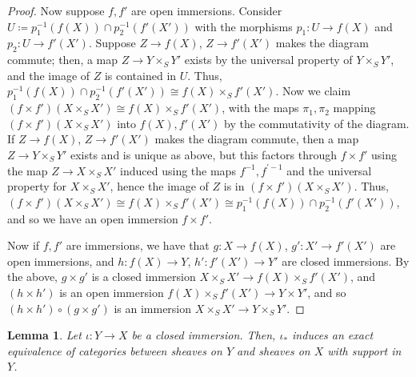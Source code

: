 \documentclass[12pt,letterpaper]{article}
\newtheorem{lemma}{Lemma}[section]
\theoremstyle{definition}
\theoremstyle{remark}
\numberwithin{equation}{section}
\numberwithin{figure}{problem}
\begin{document}
\begin{proof}
  \par Now suppose $f,f'$ are open immersions. Consider $U \coloneqq p_1^{-1}(f(X)) \cap p_2^{-1}(f'(X'))$ with the morphisms $p_1\colon U \to f(X)$ and $p_2\colon U \to f'(X')$. Suppose $Z \to f(X)$, $Z \to f'(X')$ makes the diagram commute; then, a map $Z \to Y \times_S Y'$ exists by the universal property of $Y \times_S Y'$, and the image of $Z$ is contained in $U$. Thus, $p_1^{-1}(f(X)) \cap p_2^{-1}(f'(X')) \cong f(X) \times_S f'(X')$. Now we claim $(f \times f')(X \times_S X') \cong f(X) \times_S f'(X')$, with the maps $\pi_1,\pi_2$ mapping $(f \times f')(X \times_S X')$ into $f(X),f'(X')$ by the commutativity of the diagram. If $Z \to f(X)$, $Z \to f'(X')$ makes the diagram commute, then a map $Z \to Y \times_S Y'$ exists and is unique as above, but this factors through $f \times f'$ using the map $Z \to X \times_S X'$ induced using the maps $f^{-1},f^{\prime-1}$ and the universal property for $X \times_S X'$, hence the image of $Z$ is in $(f \times f')(X \times_S X')$. Thus, $(f \times f')(X \times_S X') \cong f(X) \times_S f'(X') \cong p_1^{-1}(f(X)) \cap p_2^{-1}(f'(X'))$, and so we have an open immersion $f \times f'$.
  \par Now if $f,f'$ are immersions, we have that $g \colon X \to f(X)$, $g'\colon X' \to f'(X')$ are open immersions, and $h\colon f(X) \to Y$, $h'\colon f'(X') \to Y'$ are closed immersions. By the above, $g \times g'$ is a closed immersion $X \times_S X' \to f(X) \times_S f'(X')$, and $(h \times h')$ is an open immersion $f(X) \times_S f'(X') \to Y \times Y'$, and so $(h \times h') \circ (g \times g')$ is an immersion $X \times_S X' \to Y \times_S Y'$.
\end{proof}
\begin{lemma}\label{closedsubschemelem}
  Let $\iota\colon Y \to X$ be a closed immersion. Then, $\iota_*$ induces an exact equivalence of categories between sheaves on $Y$ and sheaves on $X$ with support in $Y$.
\end{lemma}
\end{document}
